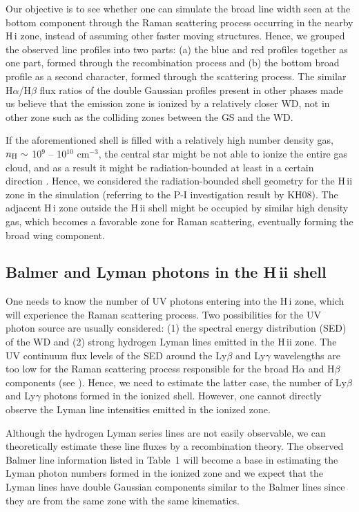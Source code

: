 \documentclass[a4paper,fleqn,usenatbib,useAMS]{mnras}
\def\ha{H{$\alpha$}}
\def\hb{H{$\beta$}}
\def\hi{H\,{\sc i}}
\def\hii{H\,{\sc ii}}
\begin{document}
{Our objective is to see whether one can simulate the broad line width seen at the bottom component through the Raman scattering process occurring in the nearby {\hi} zone, instead of assuming other faster moving structures.
Hence, we grouped the observed line profiles into two parts: (a) the blue and red profiles together as one part, formed through the recombination process and (b) the bottom broad profile as a second character, formed through the scattering process.
The similar {\ha}/{\hb} flux ratios of the double Gaussian profiles present in other phases made us believe that the emission zone is ionized by a relatively closer WD, not in other zone such as the colliding zones between the GS and the WD.

If the aforementioned shell is filled with a relatively high number density gas, $n_{\rm H} \sim$ 10$^9$ -- 10$^{10}$ cm$^{-3}$,  the central star might be not able to ionize the entire gas cloud, and as a result it might be radiation-bounded at least in a certain direction  \citep{con97}. Hence, we considered the radiation-bounded  shell geometry for the {\hii} zone in the simulation (referring to the P-I investigation result by KH08). The adjacent {\hi} zone outside the {\hii} shell might  be occupied by similar  high density gas, which becomes a favorable zone for Raman scattering, eventually forming the broad wing component.

\subsection{Balmer and  Lyman photons in the {\hii} shell}

One needs to know the number of UV photons entering into the {\hi} zone, which will experience the Raman scattering process. Two possibilities for the UV photon source are usually considered: (1) the spectral energy distribution (SED) of the WD and (2) strong hydrogen Lyman lines emitted in the {\hii} zone. The UV continuum flux levels of the SED around the Ly$\beta$ and Ly$\gamma$ wavelengths are too low for the Raman scattering process responsible for the broad {\ha} and {\hb} components (see \citealt{leh00}). Hence, we need to estimate the latter case, the number of Ly$\beta$ and Ly$\gamma$ photons formed in the ionized shell. However, one cannot directly observe the Lyman line intensities emitted in the ionized zone.

Although the hydrogen Lyman series lines are not easily observable, we can theoretically estimate these line fluxes by a recombination theory. The observed Balmer line information listed  in Table~1 will become a base in estimating the Lyman photon numbers formed in the ionized zone and we expect that the Lyman lines have  double Gaussian components similar to the Balmer lines since they are from the same zone with the same kinematics.


}
\end{document}
